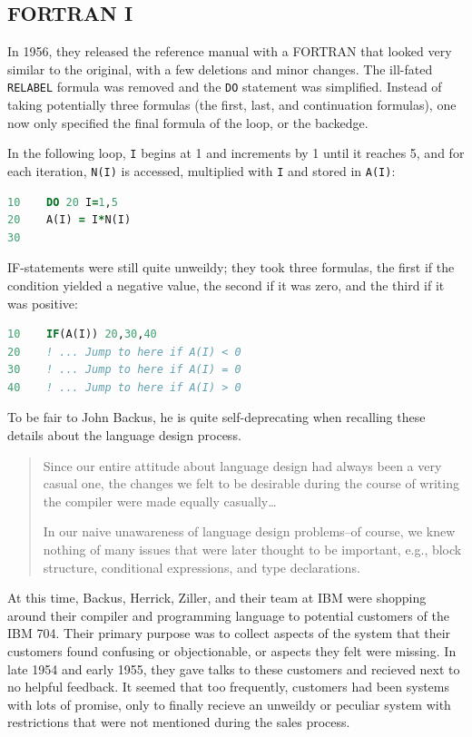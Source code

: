 
\subsection{FORTRAN I}

In 1956, they released the reference manual  with a FORTRAN
that looked very similar to the original, with a few deletions and minor changes.
The ill-fated \texttt{RELABEL} formula was removed and the \texttt{DO} statement was simplified.
Instead of taking potentially three formulas (the first, last, and continuation formulas),
one now only specified the final formula of the loop, or the \gls{backedge}.

In the following loop, \texttt{I} begins at 1 and increments by 1 until it reaches 5, and for
each iteration, \texttt{N(I)} is accessed, multiplied with \texttt{I} and stored in \texttt{A(I)}:

\begin{lstlisting}[language=Fortran,frame=single]
10    DO 20 I=1,5
20    A(I) = I*N(I)
30
\end{lstlisting}

IF-statements were still quite unweildy; they took three formulas, the first if the
condition yielded a negative value, the second if it was zero, and the third if it was positive:

\begin{lstlisting}[language=Fortran,frame=single]
10    IF(A(I)) 20,30,40
20    ! ... Jump to here if A(I) < 0
30    ! ... Jump to here if A(I) = 0
40    ! ... Jump to here if A(I) > 0
\end{lstlisting}

To be fair to John Backus, he is quite self-deprecating when recalling these details about the
language design process.

\begin{quotation}
	Since our entire attitude about language design had always been a
	very casual one, the changes we felt to be desirable during the course
	of writing the compiler were made equally casually\dots

	In our naive unawareness of language design problems--of course,
	we knew nothing of many issues that were later thought to be important,
	e.g., block structure, conditional expressions, and type declarations.
\end{quotation}

At this time, Backus, Herrick, Ziller, and their team at IBM were shopping around
their compiler and programming language to potential customers of the IBM 704.
Their primary purpose was to collect aspects of the system that their customers found
confusing or objectionable, or aspects they felt were missing.
In late 1954 and early 1955, they gave talks to these customers and recieved next to
no helpful feedback.
It seemed that too frequently, customers had been systems with lots of promise, only to
finally recieve an unweildy or peculiar system with restrictions that were not mentioned
during the sales process.

